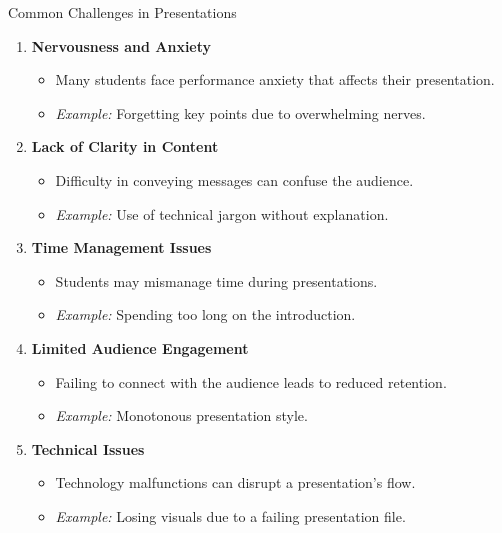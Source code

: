 \documentclass[aspectratio=169]{beamer}
\begin{document}
\begin{frame}[fragile]{Common Challenges in Presentations}
    \begin{enumerate}
        \item \textbf{Nervousness and Anxiety}
            \begin{itemize}
                \item Many students face performance anxiety that affects their presentation.
                \item \textit{Example:} Forgetting key points due to overwhelming nerves.
            \end{itemize}
        
        \item \textbf{Lack of Clarity in Content}
            \begin{itemize}
                \item Difficulty in conveying messages can confuse the audience.
                \item \textit{Example:} Use of technical jargon without explanation.
            \end{itemize}
        
        \item \textbf{Time Management Issues}
            \begin{itemize}
                \item Students may mismanage time during presentations.
                \item \textit{Example:} Spending too long on the introduction.
            \end{itemize}
        
        \item \textbf{Limited Audience Engagement}
            \begin{itemize}
                \item Failing to connect with the audience leads to reduced retention.
                \item \textit{Example:} Monotonous presentation style.
            \end{itemize}
        
        \item \textbf{Technical Issues}
            \begin{itemize}
                \item Technology malfunctions can disrupt a presentation's flow.
                \item \textit{Example:} Losing visuals due to a failing presentation file.
            \end{itemize}
    \end{enumerate}
\end{frame}
\end{document}
